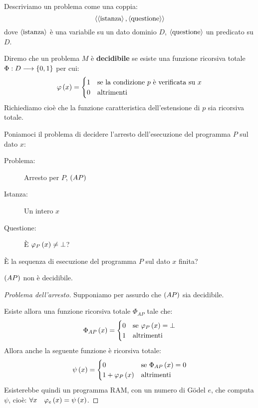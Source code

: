 \documentclass{lectures}
\begin{document}
\begin{multicols}{2}
    \begin{definition}[Problema]
        Descriviamo un problema come una coppia:
        \[
            \left\langle\left\langle\text{istanza}\right\rangle, \left\langle\text{questione}\right\rangle\right\rangle
        \]
        dove \(\left\langle\text{istanza}\right\rangle\) è una variabile su un dato dominio \(D\), \(\left\langle\text{questione}\right\rangle\) un predicato su \(D\).
    \end{definition}
    \begin{definition}
        Diremo che un problema \(M\) è \textbf{decidibile} se esiste una funzione ricorsiva totale \(\Phi:D\longrightarrow \left\{0,1\right\}\) per cui:
        \[
            \varphi\left(x\right) = \begin{cases}
                1 & \text{se la condizione \(p\) è verificata su \(x\)}\\
                0 & \text{altrimenti}
            \end{cases}
        \]
        Richiediamo cioè che la funzione caratteristica dell'estensione di \(p\) sia ricorsiva totale.
    \end{definition}
    \begin{definition}
        Poniamoci il problema di decidere l'arresto dell'esecuzione del programma \(P\) sul dato \(x\):
        \begin{description}
            \item[Problema:] Arresto per \(P\), \(\left(AP\right)\)
            \item[Istanza:] Un intero \(x\)
            \item[Questione:] È \(\varphi_P\left(x\right) \neq \bot\)?
        \end{description}
        È la sequenza di esecuzione del programma \(P\) sul dato \(x\) finita?
    \end{definition}
    \begin{theorem}
        \(\left(AP\right)\) non è decidibile.
    \end{theorem}
    \begin{proof}[Problema dell'arresto]
        Supponiamo per assurdo che \(\left(AP\right)\) sia decidibile.
        
        Esiste allora una funzione ricorsiva totale \(\Phi_{AP}\) tale che:
        \[
            \Phi_{AP}\left(x\right) = \begin{cases}
                0 & \text{se } \varphi_{P}\left(x\right) = \bot\\
                1 & \text{altrimenti}
            \end{cases}
        \]
        Allora anche la seguente funzione è ricorsiva totale:
        \[
            \psi\left(x\right) = \begin{cases}
                0 & \text{se } \Phi_{AP}\left(x\right) = 0\\
                1 + \varphi_P\left(x\right) & \text{altrimenti}
            \end{cases}
        \]
        Esisterebbe quindi un programma RAM, con un numero di Gödel \(e\), che computa \(\psi\), cioè: \(\forall x \quad \varphi_e\left(x\right) = \psi\left(x\right)\).
        

\end{proof}
\end{multicols}
\end{document}

